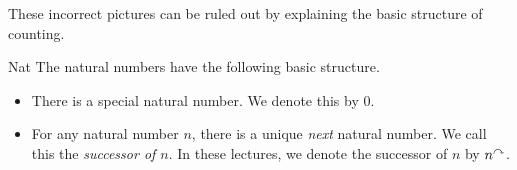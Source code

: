 These incorrect pictures can be ruled out by explaining the basic structure of counting.

\ipadbreak

\begin{signature}{Nat}\label{sig:NatSignature}
The natural numbers have the following basic structure.
  \begin{itemize}
  \item There is a special natural number. We denote this by $0$.
  \item For any natural number $n$, there is
    a unique \emph{next} natural number. We call this the \emph{successor of $n$}. 
    In these lectures, we denote the successor of $n$ by $n^\curvearrowright$.
  \end{itemize}
\end{signature}

%

